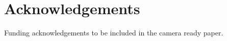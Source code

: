 \section{Acknowledgements}
\noindent
Funding acknowledgements to be included in the camera ready paper. 

